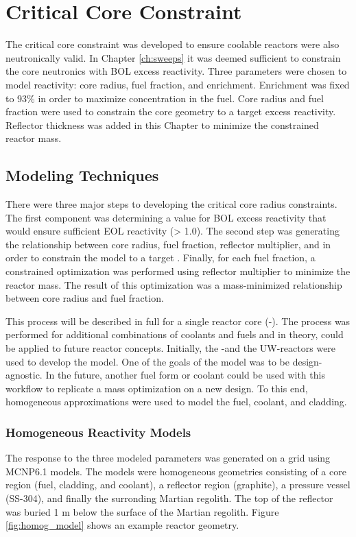 \chapter{Critical Core Constraint}\label{ch:crit_radius}
The critical core constraint was developed to ensure coolable reactors were also
neutronically valid. In Chapter \ref{ch:sweeps} it was deemed sufficient to
constrain the core neutronics with BOL excess reactivity. Three parameters were
chosen to model reactivity: core radius, fuel fraction, and enrichment.
Enrichment was fixed to 93\% in order to maximize \uran concentration in the
fuel. Core radius and fuel fraction were used to constrain the core geometry to
a target excess reactivity. Reflector thickness was added in this Chapter to
minimize the constrained reactor mass.

\section{Modeling Techniques}
There were three major steps to developing the critical core radius
constraints. The first component was determining a value for BOL excess
reactivity that would ensure sufficient EOL reactivity (\keff > 1.0).
The second step was generating the relationship between core radius, fuel
fraction, reflector multiplier, and \keff in order to constrain the model to a
target \keff. Finally, for each fuel fraction, a constrained optimization was
performed using reflector multiplier to minimize the reactor mass. The result of
this optimization was a mass-minimized relationship between core radius and fuel
fraction. 

This process will be described in full for a single reactor core (\uox-\codiox). The process
was performed for additional combinations of coolants and fuels and in theory,
could be applied to future reactor concepts. Initially, the \uox-\codiox and the
UW-\codiox reactors were used to develop the model. One of the goals of the
model was to be design-agnostic. In the future, another fuel form or coolant could be used
with this workflow to replicate a mass optimization on a new design. To this
end, homogeneous approximations were used to model the fuel, coolant, and
cladding.

\subsection{Homogeneous Reactivity Models}
The \keff response to the three modeled parameters was generated on a grid using
MCNP6.1 models. The models were homogeneous geometries consisting of
a core region (fuel, cladding, and coolant), a reflector region (graphite), a
pressure vessel (SS-304), and finally the surronding Martian regolith. The top of the
reflector was buried 1 m below the surface of the Martian regolith. Figure
\ref{fig:homog_model} shows an example reactor geometry.

